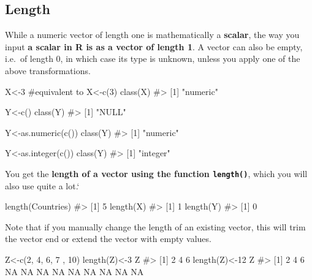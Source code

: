 \documentclass[
  letterpaper,
  DIV=11,
  numbers=noendperiod]{scrreprt}
\newenvironment{Shaded}{\begin{snugshade}}{\end{snugshade}}
\newcommand{\CommentTok}[1]{\textcolor[rgb]{0.37,0.37,0.37}{#1}}
\newcommand{\DecValTok}[1]{\textcolor[rgb]{0.68,0.00,0.00}{#1}}
\newcommand{\FunctionTok}[1]{\textcolor[rgb]{0.28,0.35,0.67}{#1}}
\newcommand{\NormalTok}[1]{\textcolor[rgb]{0.00,0.23,0.31}{#1}}
\newcommand{\OtherTok}[1]{\textcolor[rgb]{0.00,0.23,0.31}{#1}}
\begin{document}
\subsection{Length}\label{length}

While a numeric vector of length one is mathematically a
\textbf{scalar}, the way you input \textbf{a scalar in R is as a vector
of length 1}. A vector can also be empty, i.e.~of length 0, in which
case its type is unknown, unless you apply one of the above
transformations.

\begin{Shaded}
\begin{Highlighting}[]
\NormalTok{X}\OtherTok{\textless{}{-}}\DecValTok{3} \CommentTok{\#equivalent to X\textless{}{-}c(3)}
\FunctionTok{class}\NormalTok{(X)}
\CommentTok{\#\textgreater{} [1] "numeric"}

\NormalTok{Y}\OtherTok{\textless{}{-}}\FunctionTok{c}\NormalTok{()}
\FunctionTok{class}\NormalTok{(Y)}
\CommentTok{\#\textgreater{} [1] "NULL"}

\NormalTok{Y}\OtherTok{\textless{}{-}}\FunctionTok{as.numeric}\NormalTok{(}\FunctionTok{c}\NormalTok{())}
\FunctionTok{class}\NormalTok{(Y)}
\CommentTok{\#\textgreater{} [1] "numeric"}

\NormalTok{Y}\OtherTok{\textless{}{-}}\FunctionTok{as.integer}\NormalTok{(}\FunctionTok{c}\NormalTok{())}
\FunctionTok{class}\NormalTok{(Y)}
\CommentTok{\#\textgreater{} [1] "integer"}
\end{Highlighting}
\end{Shaded}

You get the \textbf{length of a vector using the function
\texttt{length()}}, which you will also use quite a lot.`

\begin{Shaded}
\begin{Highlighting}[]
\FunctionTok{length}\NormalTok{(Countries)}
\CommentTok{\#\textgreater{} [1] 5}
\FunctionTok{length}\NormalTok{(X)}
\CommentTok{\#\textgreater{} [1] 1}
\FunctionTok{length}\NormalTok{(Y)}
\CommentTok{\#\textgreater{} [1] 0}
\end{Highlighting}
\end{Shaded}

Note that if you manually change the length of an existing vector, this
will trim the vector end or extend the vector with empty values.

\begin{Shaded}
\begin{Highlighting}[]
\NormalTok{Z}\OtherTok{\textless{}{-}}\FunctionTok{c}\NormalTok{(}\DecValTok{2}\NormalTok{, }\DecValTok{4}\NormalTok{, }\DecValTok{6}\NormalTok{, }\DecValTok{7}\NormalTok{ , }\DecValTok{10}\NormalTok{)}
\FunctionTok{length}\NormalTok{(Z)}\OtherTok{\textless{}{-}}\DecValTok{3}
\NormalTok{Z}
\CommentTok{\#\textgreater{} [1] 2 4 6}
\FunctionTok{length}\NormalTok{(Z)}\OtherTok{\textless{}{-}}\DecValTok{12}
\NormalTok{Z}
\CommentTok{\#\textgreater{}  [1]  2  4  6 NA NA NA NA NA NA NA NA NA}
\end{Highlighting}
\end{Shaded}
\end{document}

